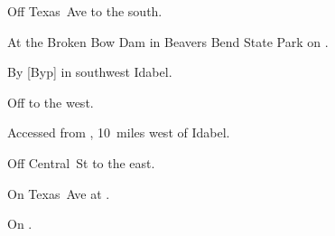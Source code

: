 
\begin{LocationList}

Off Texas~Ave to the south.

At the Broken Bow Dam in Beavers Bend State Park on .

By [Byp] in southwest Idabel.

Off   to the west.

Accessed from , 10~miles west of Idabel.

Off Central~St to the east.

\Location{\TruckService \Service}
On Texas~Ave at .

\Location{\TruckStop \Gas \Rest}
On  .

\end{LocationList}
